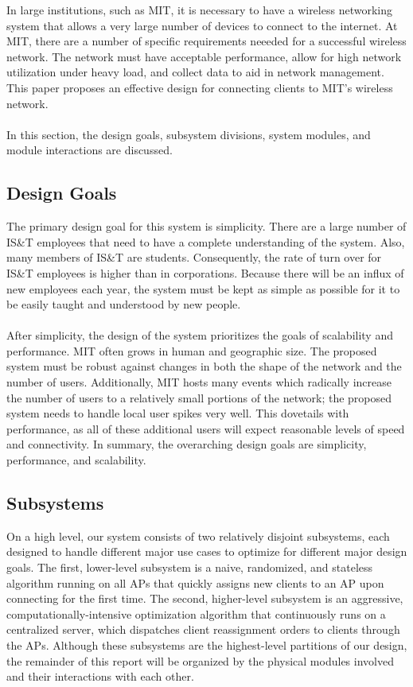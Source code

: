 \documentclass[10pt,journal,compsoc]{IEEEtran}
\begin{document}
		In large institutions, such as MIT, it is necessary to have a wireless networking system that allows a very large number of devices to connect to the internet. At MIT, there are a number of specific requirements neeeded for a successful wireless network. The network must have acceptable performance, allow for high network utilization under heavy load, and collect data to aid in network management. This paper proposes an effective design for connecting clients to MIT's wireless network.\\
        \\
        In this section, the design goals, subsystem divisions, system modules, and module interactions are discussed.
        
        \subsection{Design Goals}
        
        The primary design goal for this system is simplicity. There are a large number of IS\&T employees that need to have a complete understanding of the system. Also, many members of IS\&T are students. Consequently, the rate of turn over for IS\&T employees is higher than in corporations. Because there will be an influx of new employees each year, the system must be kept as simple as possible for it to be easily taught and understood by new people.\\
        \\
        After simplicity, the design of the system prioritizes the goals of scalability and performance. MIT often grows in human and geographic size. The proposed system must be robust against changes in both the shape of the network and the number of users. Additionally, MIT hosts many events which radically increase the number of users to a relatively small portions of the network; the proposed system needs to handle local user spikes very well. This dovetails with performance, as all of these additional users will expect reasonable levels of speed and connectivity. In summary, the overarching design goals are simplicity, performance, and scalability.
        
        \subsection{Subsystems}
        On a high level, our system consists of two relatively disjoint subsystems, each designed to handle different major use cases to optimize for different major design goals. The first, lower-level subsystem is a naive, randomized, and stateless algorithm running on all APs that quickly assigns new clients to an AP upon connecting for the first time. The second, higher-level subsystem is an aggressive, computationally-intensive optimization algorithm that continuously runs on a centralized server, which dispatches client reassignment orders to clients through the APs. Although these subsystems are the highest-level partitions of our design, the remainder of this report will be organized by the physical modules involved and their interactions with each other.
        
\end{document}
